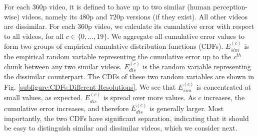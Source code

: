 \documentclass{article}
\begin{document}
For each $360$p video, it is defined to have up to two similar (human perception-wise) videos, namely its $480$p and $720$p versions (if they exist). All other videos are dissimilar. For each $360$p video, we calculate its cumulative error with respect to all videos, for all $c \in \{0, \ldots, 19\}$. We aggregate all cumulative error values to form two groups of empirical cumulative distribution functions (CDFs). $E^{(c)}_{sim}$ is the empirical random variable representing the cumulative error up to the $c^{th}$ chunk between any two similar videos. $E^{(c)}_{dis}$ is the random variable representing the dissimilar counterpart. The CDFs of these two random variables are shown in Fig. \ref{subfigure:CDFs:Different Resolutions}. We see that $E^{(c)}_{sim}$ is concentrated at small values, as expected. $E^{(c)}_{dis}$ is spread over more values. As $c$ increases, the cumulative error increases, and therefore $E^{(c)}_{dis}$ is generally larger. Most importantly, the two CDFs have significant separation, indicating that it should be easy to distinguish similar and dissimilar videos, which we consider next.
\end{document}
